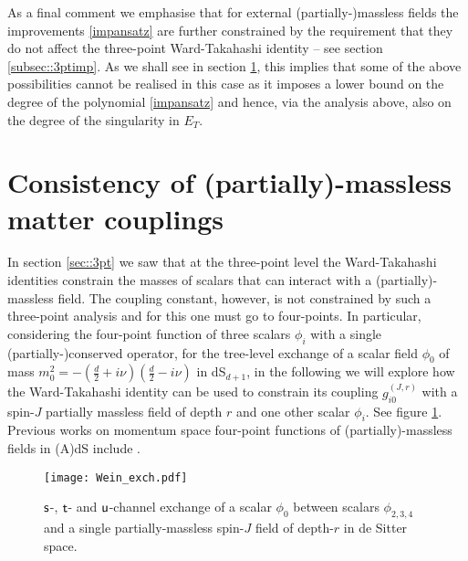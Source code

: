 \documentclass[11pt,a4paper]{article}
\begin{document}
As a final comment we emphasise that for external (partially-)massless fields the improvements \eqref{impansatz} are further constrained by the requirement that they do not affect the three-point Ward-Takahashi identity -- see section \ref{subsec::3ptimp}. As we shall see in section \ref{sec::4ptWT}, this implies that some of the above possibilities cannot be realised in this case as it imposes a lower bound on the degree of the polynomial \eqref{impansatz} and hence, via the analysis above, also on the degree of the singularity in $E_T$. 


\section{Consistency of (partially)-massless matter couplings}
\label{sec::4ptWT}

In section \ref{sec::3pt} we saw that at the three-point level the Ward-Takahashi identities constrain the masses of scalars that can interact with a (partially)-massless field. The coupling constant, however, is not constrained by such a three-point analysis and for this one must go to four-points. In particular, considering the four-point function of three scalars $\phi_i$ with a single (partially-)conserved operator, for the tree-level exchange of a scalar field $\phi_0$ of mass $m^2_0 = -(\tfrac{d}{2}+i\nu)(\tfrac{d}{2}-i\nu)$ in dS$_{d+1}$, in the following we will explore how the Ward-Takahashi identity can be used to constrain its coupling $g^{\left(J,r\right)}_{i0}$ with a spin-$J$ partially massless field of depth $r$ and one other scalar $\phi_i$. See figure \ref{fig::exch}. Previous works on momentum space four-point functions of (partially)-massless fields in (A)dS include \cite{Raju:2010by,Raju:2011mp,Raju:2012zs,Albayrak:2018tam,Albayrak:2019asr,Albayrak:2019yve,Baumann:2020dch,Sleight:2020obc,Meltzer:2020qbr,Albayrak:2020fyp,Armstrong:2020woi,Melville:2021lst,Meltzer:2021bmb}.

\begin{figure}[t]
    \centering
    \captionsetup{width=0.95\textwidth}
    \texttt{[image: Wein\_exch.pdf]}
    \caption{${\sf s}$-, ${\sf t}$- and ${\sf u}$-channel exchange of a scalar $\phi_0$ between scalars $\phi_{2,3,4}$ and a single partially-massless spin-$J$ field of depth-$r$ in de Sitter space.}
    \label{fig::exch}
\end{figure}
\end{document}
